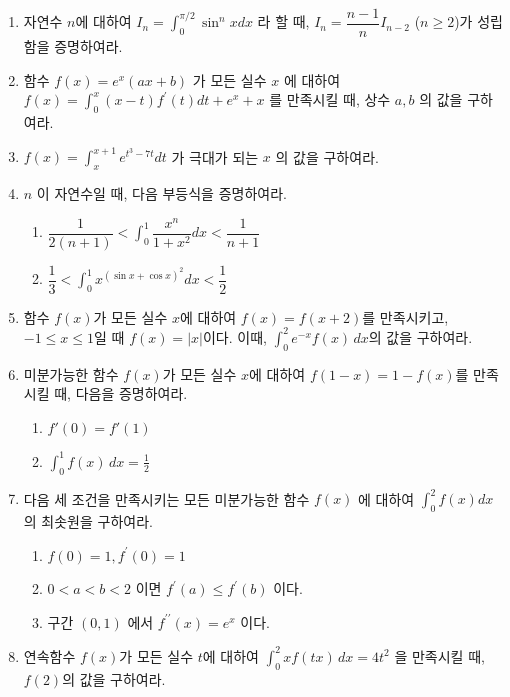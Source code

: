 \documentclass[12pt, a4paper]{article}
\begin{document}
\begin{enumerate}
\item 자연수 $n$에 대하여 $I_n = \displaystyle\int_{0}^{\pi/2} \sin^n x dx$ 라 할 때, $I_n = \dfrac{n-1}{n} I_{n-2}$ ($n \ge 2$)가 성립함을 증명하여라.

\item 함수 $f(x) = e^x(ax+b)$ 가 모든 실수 $x$ 에 대하여 $f(x) = \displaystyle \int_{0}^{x} (x-t)f^{\prime}(t) dt + e^x + x$ 를 만족시킬 때, 상수 $a, b$ 의 값을 구하여라. 

\item $f(x) = \displaystyle \int_{x}^{x+1} e^{t^3-7t} dt$ 가 극대가 되는 $x$ 의 값을 구하여라.

\item $n$ 이 자연수일 때, 다음 부등식을 증명하여라. 
\begin{enumerate}[label=(\arabic*)]
    \item $\dfrac{1}{2(n+1)} < \displaystyle \int_{0}^{1} \dfrac{x^n}{1+x^2} dx < \dfrac{1}{n+1}$
    \item $\dfrac{1}{3} < \displaystyle \int_{0}^{1} x^{( \sin x + \cos x )^2} dx < \dfrac{1}{2}$
\end{enumerate}

\item 함수 $f(x)$가 모든 실수 $x$에 대하여 $f(x) = f(x+2)$를 만족시키고, $-1 \le x \le 1$일 때 $f(x) = |x|$이다. 이때, $\int_{0}^{2} e^{-x} f(x) \, dx$의 값을 구하여라.

\item 미분가능한 함수 $f(x)$가 모든 실수 $x$에 대하여 $f(1-x) = 1-f(x)$를 만족시킬 때, 다음을 증명하여라.
\begin{enumerate} [label=(\arabic*), leftmargin=8mm, nosep]
    \item $f'(0) = f'(1)$
    \item $\int_{0}^{1} f(x) \, dx = \frac{1}{2}$
\end{enumerate}

\item 다음 세 조건을 만족시키는 모든 미분가능한 함수 $f(x)$ 에 대하여 $\displaystyle \int_0^2 f(x) dx$ 의 최솟원을 구하여라.
    \begin{enumerate}[label=(\roman*), nosep]
        \item $f(0)=1, f^{\prime}(0)=1$
        \item $0 < a < b < 2$ 이면 $f^{\prime}(a) \le f^{\prime}(b)$ 이다.
        \item 구간 $(0, 1)$ 에서 $f^{\prime\prime}(x) = e^x$ 이다.
    \end{enumerate}

\item 연속함수 $f(x)$가 모든 실수 $t$에 대하여 $\int_{0}^{2} x f(tx) \, dx = 4t^2 $
을 만족시킬 때, $f(2)$의 값을 구하여라.

\end{enumerate}
\end{document}

